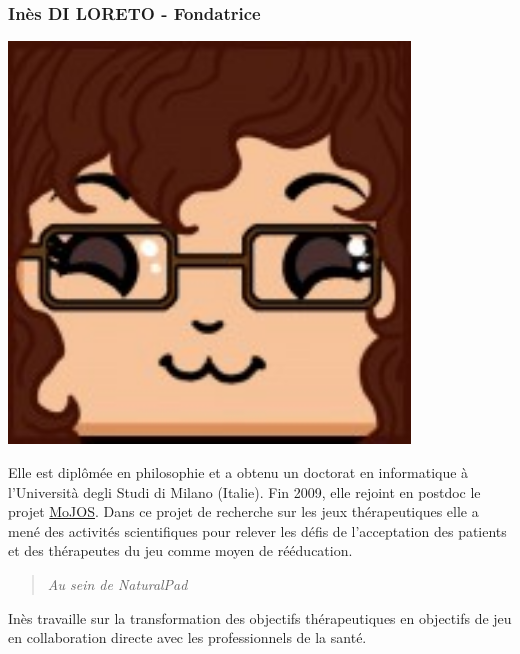 		\subsubsection*{Inès DI LORETO - Fondatrice}
\begin{minipage}[t!]{0.2\linewidth}
\centering
\includegraphics[width=0.8\textwidth]{images/tetocarre/ines}
\end{minipage}
\begin{minipage}[t!]{0.79\linewidth}
Elle est diplômée en philosophie et a obtenu un doctorat en informatique à l’Università degli Studi di Milano (Italie). Fin 2009, elle rejoint en postdoc le projet \href{http://www.mojos.fr}{MoJOS}. Dans ce projet de recherche sur les jeux thérapeutiques elle a mené des activités scientifiques pour relever les défis de l’acceptation des patients et des thérapeutes du jeu comme moyen de rééducation. 
		\begin{quotation} \emph{Au sein de NaturalPad} \end{quotation}
Inès travaille sur la transformation des objectifs thérapeutiques en objectifs de jeu en collaboration directe avec les professionnels de la santé.
\end{minipage}

